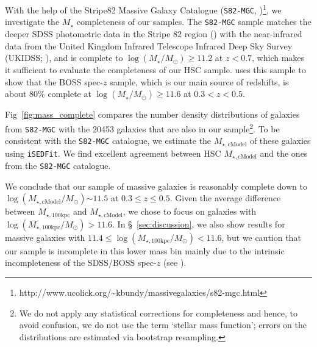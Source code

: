 \documentclass[fleqn,usenatbib]{mnras}
\def\mstar{{$M_{\star}$}}
\def\logms{{$\log (M_{\star}/M_{\odot})$}}
\def\mtot{{$M_{\star,100\mathrm{kpc}}$}}
\def\mcmodel{{$M_{\star,\mathrm{cModel}}$}}
\def\logmtot{{$\log (M_{\star,100\mathrm{kpc}}/M_{\odot})$}}
\def\logmcmodel{{$\log (M_{\star,\mathrm{cModel}}/M_{\odot})$}}
\begin{document}
    With the help of the Stripe82 Massive Galaxy Catalogue (\texttt{S82-MGC},
    \citealt{Bundy2015}
    )\footnote{http://www.ucolick.org/\~{}kbundy/massivegalaxies/s82-mgc.html}, 
    we investigate the \mstar{} completeness of our samples. 
    The \texttt{S82-MGC} sample matches the deeper SDSS photometric data in the 
    Stripe 82 region (\citealt{Annis2014}) with the near-infrared data from the United 
    Kingdom Infrared Telescope Infrared Deep Sky Survey (UKIDSS; 
    \citealt{Lawrence2007}), and is complete to \logms{}$\geq 11.2$ at $z<0.7$, 
    which makes it sufficient to evaluate the completeness of our HSC sample. 
    \citet{Leauthaud2016} uses this sample to show that the BOSS spec-$z$ sample, 
    which is our main source of redshifts, is about 80\% complete at 
    \logms{}$\geq 11.6$ at $0.3 < z < 0.5$.
    
    Fig~\ref{fig:mass_complete} compares the number density distributions of 
    galaxies from \texttt{S82-MGC} with the 20453 galaxies that are also in 
    our sample\footnote{We do not apply any statistical corrections for completeness 
    and hence, to avoid confusion, we do not use the term `stellar mass function';
    errors on the distributions are estimated via bootstrap resampling.}.
    To be consistent with the \texttt{S82-MGC} catalogue, we estimate the \mcmodel{}
    of these galaxies using \texttt{iSEDFit}.
    We find excellent agreement between HSC \mcmodel{} and the ones from the
    \texttt{S82-MGC} catalogue.

    We conclude that our sample of massive galaxies is reasonably complete down 
    to \logmcmodel{}${\sim} 11.5$ at $0.3 \leq z \leq 0.5$.    
    Given the average difference between \mtot{} and \mcmodel{}, we chose to focus on 
    galaxies with \logmtot{}$> 11.6$. 
    In \S~\ref{sec:discussion}, we also show results for massive galaxies 
    with $11.4 \le$\logmtot{}$<11.6$, but we caution that our sample is incomplete 
    in this lower mass bin mainly due to the intrinsic incompleteness of the 
    SDSS/BOSS spec-$z$ (see \citealt{Leauthaud2016}).
    
\end{document}
